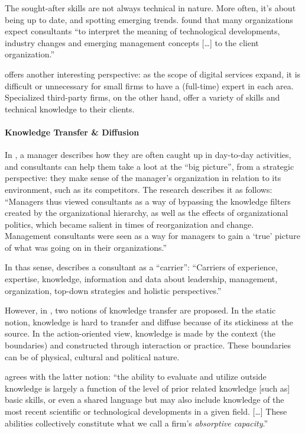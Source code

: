\documentclass[12pt]{article}
\begin{document}
The sought-after skills are not always technical in nature. More often,
it's about being up to date, and spotting emerging trends.
\citet[53]{werr2002} found that many organizations expect consultants
``to interpret the meaning of technological developments, industry
changes and emerging management concepts {[}\ldots{]} to the client
organization.''

\citet[452]{ketler1993} offers another interesting perspective: as the
scope of digital services expand, it is difficult or unnecessary for
small firms to have a (full-time) expert in each area. Specialized
third-party firms, on the other hand, offer a variety of skills and
technical knowledge to their clients.

\paragraph{Knowledge Transfer \&
Diffusion}\label{knowledge-transfer-diffusion}

In \citet[53-54]{werr2002}, a manager describes how they are often
caught up in day-to-day activities, and consultants can help them take a
loot at the ``big picture'', from a strategic perspective: they make
sense of the manager's organization in relation to its environment, such
as its competitors. The research describes it as follows: ``Managers
thus viewed consultants as a way of bypassing the knowledge filters
created by the organizational hierarchy, as well as the effects of
organizational politics, which became salient in times of reorganization
and change. Management consultants were seen as a way for managers to
gain a `true' picture of what was going on in their organizations.''

In thas sense, \citet[269]{furusten2009} describes a consultant as a
``carrier'': ``Carriers of experience, expertise, knowledge, information
and data about leadership, management, organization, top-down strategies
and holistic perspectives.''

However, in \citet[633]{sturdy2009}, two notions of knowledge transfer
are proposed. In the static notion, knowledge is hard to transfer and
diffuse because of its stickiness at the source. In the action-oriented
view, knowledge is made by the context (the boundaries) and constructed
through interaction or practice. These boundaries can be of physical,
cultural and political nature.

\citet[128-129]{cohen1990} agrees with the latter notion: ``the ability
to evaluate and utilize outside knowledge is largely a function of the
level of prior related knowledge {[}such as{]} basic skills, or even a
shared language but may also include knowledge of the most recent
scientific or technological developments in a given field. {[}\ldots{]}
These abilities collectively constitute what we call a firm's
\emph{absorptive capacity}.''
\end{document}
